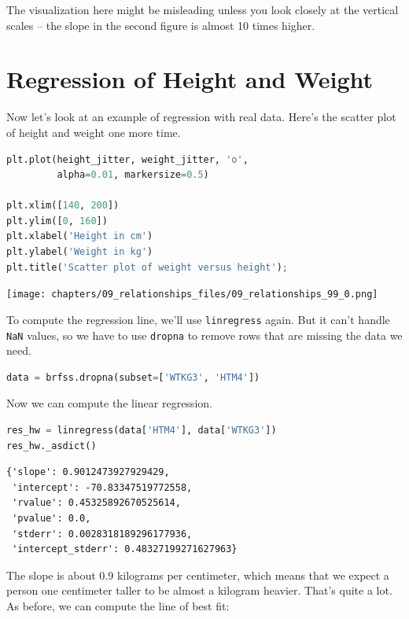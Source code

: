 The visualization here might be misleading unless you look closely at
the vertical scales -- the slope in the second figure is almost 10 times
higher.

\hypertarget{regression-of-height-and-weight}{%
\section{Regression of Height and
Weight}\label{regression-of-height-and-weight}}

Now let's look at an example of regression with real data. Here's the
scatter plot of height and weight one more time.

\begin{lstlisting}[language=Python,style=source]
plt.plot(height_jitter, weight_jitter, 'o', 
         alpha=0.01, markersize=0.5)

plt.xlim([140, 200])
plt.ylim([0, 160])
plt.xlabel('Height in cm')
plt.ylabel('Weight in kg')
plt.title('Scatter plot of weight versus height');
\end{lstlisting}

\begin{center}
\texttt{[image: chapters/09\_relationships\_files/09\_relationships\_99\_0.png]}
\end{center}

To compute the regression line, we'll use
\passthrough{\lstinline!linregress!} again. But it can't handle
\passthrough{\lstinline!NaN!} values, so we have to use
\passthrough{\lstinline!dropna!} to remove rows that are missing the
data we need.

\begin{lstlisting}[language=Python,style=source]
data = brfss.dropna(subset=['WTKG3', 'HTM4'])
\end{lstlisting}

Now we can compute the linear regression.

\begin{lstlisting}[language=Python,style=source]
res_hw = linregress(data['HTM4'], data['WTKG3'])
res_hw._asdict()
\end{lstlisting}

\begin{lstlisting}[style=output]
{'slope': 0.9012473927929429,
 'intercept': -70.83347519772558,
 'rvalue': 0.45325892670525614,
 'pvalue': 0.0,
 'stderr': 0.0028318189296177936,
 'intercept_stderr': 0.48327199271627963}
\end{lstlisting}

The slope is about 0.9 kilograms per centimeter, which means that we
expect a person one centimeter taller to be almost a kilogram heavier.
That's quite a lot. As before, we can compute the line of best fit:


